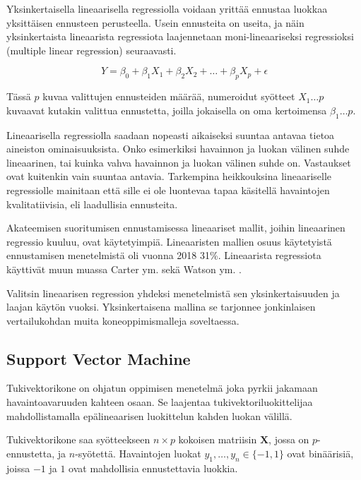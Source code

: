 \documentclass[finnish,twoside,openright]{HYgraduMLDS}
\begin{document}
Yksinkertaisella lineaarisella regressiolla voidaan yrittää ennustaa luokkaa yksittäisen ennusteen perusteella. Usein ennusteita on useita, ja näin yksinkertaista lineaarista regressiota laajennetaan moni-lineaariseksi regressioksi (multiple linear regression) seuraavasti.

\begin{equation} \label{eq:2}
    Y = \beta_0 + \beta_1 X_1 + \beta_2 X_2 + \dots + \beta_p X_p + \epsilon
\end{equation}

Tässä $p$ kuvaa valittujen ennusteiden määrää, numeroidut syötteet $X_1\dots p$ kuvaavat kutakin valittua ennustetta, joilla jokaisella on oma kertoimensa $\beta_1\dots p$.

Lineaarisella regressiolla saadaan nopeasti aikaiseksi suuntaa antavaa tietoa aineiston ominaisuuksista. Onko esimerkiksi havainnon ja luokan välinen suhde lineaarinen, tai kuinka vahva havainnon ja luokan välinen suhde on. Vastaukset ovat kuitenkin vain suuntaa antavia. Tarkempina heikkouksina lineaariselle regressiolle mainitaan että sille ei ole luontevaa tapaa käsitellä havaintojen kvalitatiivisia, eli laadullisia ennusteita\cite{james2013ISLR}. 

Akateemisen suoritumisen ennustamisessa lineaariset mallit, joihin lineaarinen regressio kuuluu, ovat käytetyimpiä. Lineaaristen mallien osuus käytetyistä ennustamisen menetelmistä oli vuonna 2018 31\%\cite{hellas2018predicting}. Lineaarista regressiota käyttivät muun muassa Carter ym. \cite{carter2015normalized} sekä Watson ym. \cite{watson2013predicting}.

Valitsin lineaarisen regression yhdeksi menetelmistä sen yksinkertaisuuden ja laajan käytön vuoksi. Yksinkertaisena mallina se tarjonnee jonkinlaisen vertailukohdan muita koneoppimismalleja soveltaessa.


\subsection{Support Vector Machine}

Tukivektorikone on ohjatun oppimisen menetelmä joka pyrkii jakamaan havaintoavaruuden kahteen osaan. Se laajentaa tukivektoriluokittelijaa mahdollistamalla epälineaarisen luokittelun kahden luokan välillä\cite{james2013ISLR}.

Tukivektorikone saa syötteekseen $n \times p$ kokoisen matriisin $\textbf{X}$, jossa on $p$-ennustetta, ja $n$-syötettä. Havaintojen luokat $y_1, \dots, y_n \in \{-1, 1\}$ ovat binäärisiä, joissa $-1$ ja $1$ ovat mahdollisia ennustettavia luokkia. 
\end{document}
